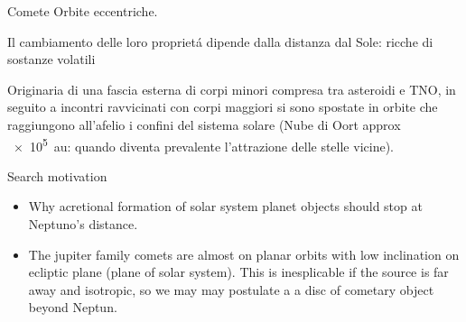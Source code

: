 \begin{frame}{Comete}
Orbite eccentriche.

Il cambiamento delle loro propriet\'a dipende dalla distanza dal Sole: ricche di sostanze volatili

Originaria di una fascia esterna di corpi minori compresa tra asteroidi e TNO, in seguito a incontri ravvicinati con corpi maggiori si sono spostate in orbite che raggiungono all'afelio i confini del sistema solare (Nube di Oort approx \SI{e5}{\astronomicalunit}: quando diventa prevalente l'attrazione delle stelle vicine).
\end{frame}

\begin{frame}{Search motivation}
\begin{itemize}
\item Why acretional formation of solar system planet objects should stop at Neptuno's distance.
\item The jupiter family comets are almost on planar orbits with low inclination on ecliptic plane (plane of solar system). This is inesplicable if the source is far away and isotropic, so we may may postulate a a disc of cometary object beyond Neptun.
\end{itemize}
\end{frame}
